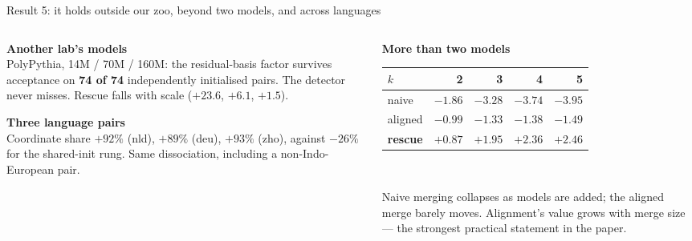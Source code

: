 \documentclass{beamer}
\begin{document}
\begin{frame}{Result 5: it holds outside our zoo, beyond two models, and across languages}
  \begin{columns}[T]
    \begin{column}{0.5\textwidth}
      \textbf{Another lab's models}\\[0.2em]
      {\footnotesize PolyPythia, 14M / 70M / 160M: the residual-basis factor survives acceptance on
      \textbf{74 of 74} independently initialised pairs. The detector never misses. Rescue falls
      with scale ($+23.6$, $+6.1$, $+1.5$).}
      \vspace{0.8em}

      \textbf{Three language pairs}\\[0.2em]
      {\footnotesize Coordinate share $+92\%$ (nld), $+89\%$ (deu), $+93\%$ (zho), against
      $-26\%$ for the shared-init rung. Same dissociation, including a non-Indo-European pair.}
    \end{column}
    \begin{column}{0.5\textwidth}
      \textbf{More than two models}\\[0.2em]
      \centering\footnotesize
      \begin{tabular}{lrrrr}
        \toprule
        $k$ & 2 & 3 & 4 & 5 \\
        \midrule
        naive   & $-1.86$ & $-3.28$ & $-3.74$ & $-3.95$ \\
        aligned & $-0.99$ & $-1.33$ & $-1.38$ & $-1.49$ \\
        \textbf{rescue} & $+0.87$ & $+1.95$ & $+2.36$ & $\mathbf{+2.46}$ \\
        \bottomrule
      \end{tabular}
      \\[0.5em]
      {\footnotesize \raggedright Naive merging collapses as models are added; the aligned merge
      barely moves. \alert{Alignment's value grows with merge size} --- the strongest practical
      statement in the paper.}
    \end{column}
  \end{columns}
\end{frame}
\end{document}
